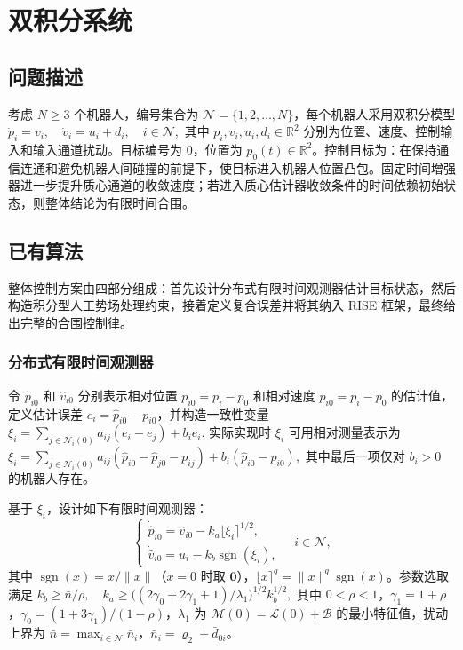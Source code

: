 \section{双积分系统}

\subsection{问题描述}

考虑 $N\ge 3$ 个机器人，编号集合为 $\mathcal{N}=\{1,2,\ldots,N\}$，每个机器人采用双积分模型
$\dot p_i=v_i,\quad \dot v_i=u_i+d_i,\quad i\in\mathcal{N},$
其中 $p_i,v_i,u_i,d_i\in\mathbb{R}^2$ 分别为位置、速度、控制输入和输入通道扰动。目标编号为 $0$，位置为 $p_0(t)\in\mathbb{R}^2$。控制目标为：在保持通信连通和避免机器人间碰撞的前提下，使目标进入机器人位置凸包。固定时间增强器进一步提升质心通道的收敛速度；若进入质心估计器收敛条件的时间依赖初始状态，则整体结论为有限时间合围。

\subsection{已有算法}

整体控制方案由四部分组成：首先设计分布式有限时间观测器估计目标状态，然后构造积分型人工势场处理约束，接着定义复合误差并将其纳入 RISE 框架，最终给出完整的合围控制律。

\subsubsection{分布式有限时间观测器}

令 $\hat p_{i0}$ 和 $\hat v_{i0}$ 分别表示相对位置 $p_{i0}=p_i-p_0$ 和相对速度 $\dot p_{i0}=\dot p_i-\dot p_0$ 的估计值，定义估计误差 $e_i=\hat p_{i0}-p_{i0}$，并构造一致性变量
$\xi_i=\sum_{j\in\mathcal{N}_i(0)}a_{ij}(e_i-e_j)+b_i e_i.$
实际实现时 $\xi_i$ 可用相对测量表示为
$\xi_i=\sum_{j\in\mathcal{N}_i(0)}a_{ij}(\hat p_{i0}-\hat p_{j0}-p_{ij})+b_i(\hat p_{i0}-p_{i0}),$
其中最后一项仅对 $b_i>0$ 的机器人存在。

基于 $\xi_i$，设计如下有限时间观测器：
$$
\begin{cases}
\dot{\hat p}_{i0}=\hat v_{i0}-k_a\lfloor\xi_i\rceil^{1/2},\\
\dot{\hat v}_{i0}=u_i-k_b\operatorname{sgn}(\xi_i),
\end{cases}
\quad i\in\mathcal{N},
$$
其中 $\operatorname{sgn}(x)=x/\|x\|$（$x=0$ 时取 $\mathbf{0}$），$\lfloor x\rceil^q=\|x\|^q\operatorname{sgn}(x)$。参数选取满足
$k_b\ge \bar n/\rho,\quad k_a\ge \bigl((2\gamma_0+2\gamma_1+1)/\lambda_1\bigr)^{1/2}k_b^{1/2},$
其中 $0<\rho<1$，$\gamma_1=1+\rho$，$\gamma_0=(1+3\gamma_1)/(1-\rho)$，$\lambda_1$ 为 $\mathcal{M}(0)=\mathcal{L}(0)+\mathcal{B}$ 的最小特征值，扰动上界为 $\bar n=\max_{i\in\mathcal{N}}\bar n_i$，$\bar n_i=\varrho_2+\bar d_{0i}$。


